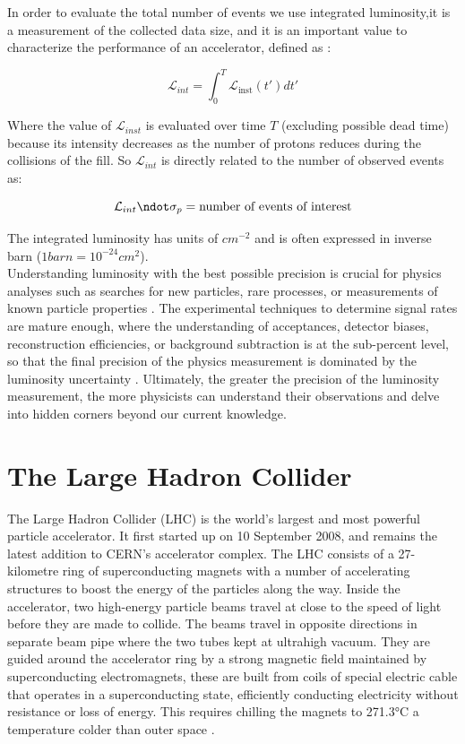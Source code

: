 In order to evaluate the total number of events we use integrated luminosity,it is a measurement of the collected data size, and it is an important value to characterize the performance of an accelerator, defined as \cite{concept_of_luminosity}:

\begin{equation}
  \mathcal{L}_{int}=\int_{0}^{T} \mathcal {L}_{\text{inst}}(t') dt'
\end{equation}

Where the value of $\mathcal{L}_{inst}$ is evaluated over time $T$ (excluding possible dead time) because its intensity decreases as the number of protons reduces during the collisions of the fill. So $\mathcal{L}_{int}$ is directly related to the number of observed events as:

\begin{equation}
  \mathcal{L}_{int} \ndot \sigma_{p}= \text{number of events of interest}
\end{equation}

The integrated luminosity has units of $cm^{-2}$ and is often expressed in inverse barn ($1 barn= 10^{-24}cm^{2}$). \\

Understanding luminosity with the best possible precision is crucial for physics analyses such as searches for new particles, rare processes, or measurements of known particle properties \cite{lumi_motiv}.
The experimental techniques to determine signal rates are mature enough, where the understanding of acceptances, detector biases, reconstruction efficiencies, or background subtraction is at the sub-percent level, so that the final precision of the physics measurement is dominated by the luminosity uncertainty \cite{lumi_paper_def_and_concept}. Ultimately, the greater the precision of the luminosity measurement, the more physicists can understand their observations and delve into hidden corners beyond our current knowledge.

\section{The Large Hadron Collider}

The Large Hadron Collider (LHC) is the world’s largest and most powerful particle accelerator. It first started up on 10 September 2008, and remains the latest addition to CERN’s accelerator complex. The LHC consists of a 27-kilometre ring of superconducting magnets with a number of accelerating structures to boost the energy of the particles along the way. Inside the accelerator, two high-energy particle beams travel at close to the speed of light before they are made to collide. The beams travel in opposite directions in separate beam pipe where the two tubes kept at ultrahigh vacuum. They are guided around the accelerator ring by a strong magnetic field maintained by superconducting electromagnets, these are built from coils of special electric cable that operates in a superconducting state, efficiently conducting electricity without resistance or loss of energy. This requires chilling the magnets to 271.3°C  a temperature colder than outer space \cite{LHC}.\\ 

